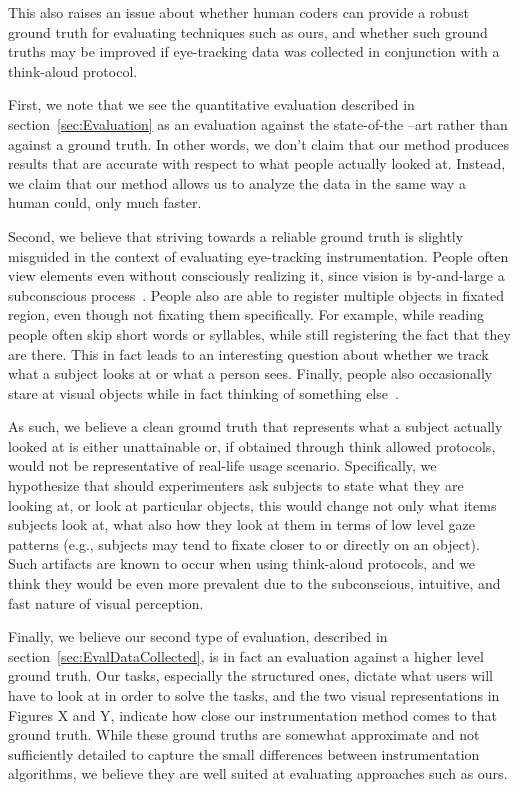 This also raises an issue about whether human coders can provide a robust ground truth for evaluating techniques such as ours, and whether such ground truths may be improved if eye-tracking data was collected in conjunction with a think-aloud protocol. 


First, we note that we see the quantitative evaluation described in section~\ref{sec:Evaluation} as an evaluation against the state-of-the –art rather than against a ground truth. In other words, we don't claim that our method produces results that are accurate with respect to what people actually looked at. Instead, we claim that our method allows us to analyze the data in the same way a human could, only much faster. 

Second, we believe that striving towards a reliable ground truth is slightly misguided in the context of evaluating eye-tracking instrumentation.  People often view elements even without consciously realizing it, since vision is by-and-large a subconscious process~\cite{duchowski2007eye}. People also are able to register multiple objects in fixated region, even though not fixating them specifically. For example, while reading people often skip short words or syllables, while still registering the fact that they are there. This in fact leads to an interesting question about whether we track what a subject looks at or what a person sees. Finally, people also occasionally stare at visual objects while in fact thinking of something else~\cite{duchowski2007eye}. 


As such, we believe a clean ground truth that represents what a subject actually looked at is either unattainable or, if obtained through think allowed protocols, would not be representative of real-life usage scenario. Specifically, we hypothesize that should experimenters ask subjects to state what they are looking at, or look at particular objects, this would change not only what items subjects look at, what also how they look at them in terms of low level gaze patterns (e.g., subjects may tend to fixate closer to or directly on an object). Such artifacts are known to occur when using think-aloud protocols, and we think they would be even more prevalent due to the subconscious, intuitive, and fast nature of visual perception.   

Finally, we believe our second type of evaluation, described in section~\ref{sec:EvalDataCollected}, is in fact an evaluation against a higher level ground truth. Our tasks, especially the structured ones, dictate what users will have to look at in order to solve the tasks, and the two visual representations in Figures X and Y, indicate how close our instrumentation method comes to that ground truth. While these ground truths are somewhat approximate and not sufficiently detailed to capture the small differences between instrumentation algorithms, we believe they are well suited at evaluating approaches such as ours.   
